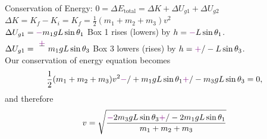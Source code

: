 \documentclass[]{article}
\begin{document}
\begin{TeacherMargin}
\noindent Conservation of Energy: $0 = \Delta E_{\text{total}} = \Delta K + \Delta U_{g1} + \Delta U_{g2}$ \\
$\Delta K = K_{f}-K_{i} = K_{f} = \frac{1}{2}(m_{1}+m_{2}+m_{3})v^{2}$ \\
$\Delta U_{g1} = {\color{violet}-}m_{1}gL\sin\theta_{1}$ \quad Box 1 rises {\color{violet}(lowers)} by $h={\color{violet}-}L\sin\theta_{1}$. \\
$\Delta U_{g1} = \Vpm m_{1}gL\sin\theta_{3}$ \quad Box 3 lowers {\color{violet}(rises)} by $h={\color{violet}+}/-L\sin\theta_{3}$. \\
Our conservation of energy equation becomes
\[
\frac{1}{2}(m_{1}+m_{2}+m_{3})v^{2} {\color{violet}-}/+ m_{1}gL\sin\theta_{1} {\color{violet}+}/- m_{3}gL\sin\theta_{3} = 0,
\]
and therefore
\[
v=\sqrt{\frac{{\color{violet}-}2m_{3}gL\sin\theta_{3} {\color{violet}+}/-2m_{1}gL\sin\theta_{1}}{m_{1}+m_{2}+m_{3}}}
\]
\end{TeacherMargin}
\end{document}
